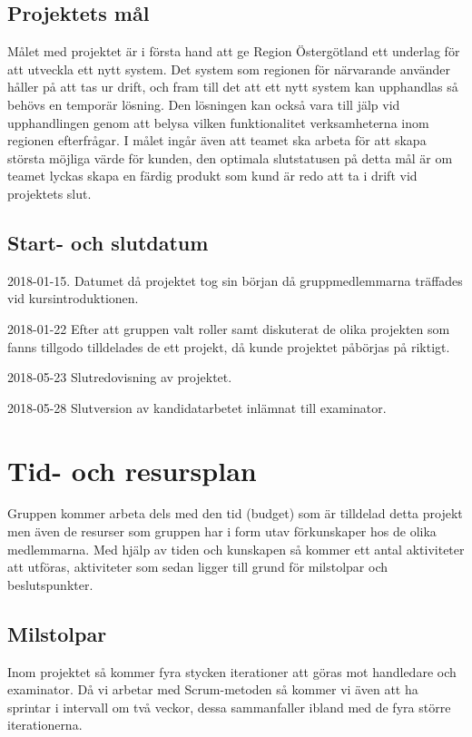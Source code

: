 \documentclass[a4paper,10pt]{article}
\begin{document}
\subsection{Projektets mål}
Målet med projektet är i första hand att ge Region Östergötland ett underlag för att utveckla ett nytt system. Det system som regionen för närvarande använder håller på att tas ur drift, och fram till det att ett nytt system kan upphandlas så behövs en temporär lösning. Den lösningen kan också vara till jälp vid upphandlingen genom att belysa vilken funktionalitet verksamheterna inom regionen efterfrågar. I målet ingår även att teamet ska arbeta för att skapa största möjliga värde för kunden, den optimala slutstatusen på detta mål är om teamet lyckas skapa en färdig produkt som kund är redo att ta i drift vid projektets slut.
\subsection{Start- och slutdatum}
2018-01-15.
Datumet då projektet tog sin början då gruppmedlemmarna träffades vid kursintroduktionen.

2018-01-22
Efter att gruppen valt roller samt diskuterat de olika projekten som fanns tillgodo tilldelades de ett projekt, då kunde projektet påbörjas på riktigt.

2018-05-23
Slutredovisning av projektet.

2018-05-28
Slutversion av kandidatarbetet inlämnat till examinator.

\newpage

\section{Tid- och resursplan}
Gruppen kommer arbeta dels med den tid (budget) som är tilldelad detta projekt men även de resurser som gruppen har i form utav förkunskaper hos de olika medlemmarna. Med hjälp av tiden och kunskapen så kommer ett antal aktiviteter att utföras, aktiviteter som sedan ligger till grund för milstolpar och beslutspunkter.
\subsection{Milstolpar}
Inom projektet så kommer fyra stycken iterationer att göras mot handledare och examinator. Då vi arbetar med Scrum-metoden så kommer vi även att ha sprintar i intervall om två veckor, dessa sammanfaller ibland med de fyra större iterationerna.
\end{document}
